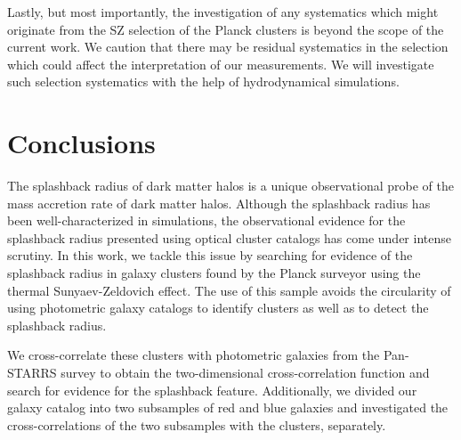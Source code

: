 \documentclass[iop, apjl, twocolappendix, numberedappendix]{emulateapj}
\begin{document}
Lastly, but most importantly, the investigation of any systematics
which might originate from the SZ selection of the Planck clusters
is beyond the scope of the current work. We caution that there may
be residual systematics in the selection which could affect the
interpretation of our measurements. We will investigate such
selection systematics with the help of hydrodynamical simulations.

\section{Conclusions}
\label{sec:Conclusions}
The splashback radius of dark matter halos is a unique observational
probe of the mass accretion rate of dark matter halos. Although the
splashback radius has been well-characterized in simulations, the
observational evidence for the splashback radius presented using
optical cluster catalogs has come under intense scrutiny. In this
work, we tackle this issue by searching for evidence of the
splashback radius in galaxy clusters found by the Planck surveyor using
the thermal Sunyaev-Zeldovich effect. The use of this sample avoids
the circularity of using photometric galaxy catalogs to identify
clusters as well as to detect the splashback radius. 


We cross-correlate these clusters with photometric galaxies from the
Pan-STARRS survey to obtain the two-dimensional cross-correlation
function and search for evidence for the splashback feature.
Additionally, we divided our galaxy catalog into two subsamples of
red and blue galaxies and investigated the cross-correlations of the
two subsamples with the clusters, separately.

\end{document}
